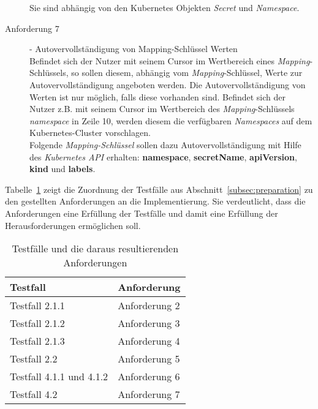 \begin{description}
        Sie sind abhängig von den Kubernetes Objekten \textit{Secret} und \textit{Namespace}.
  \item[Anforderung 7]{- Autovervollständigung von Mapping-Schlüssel Werten\\}
        Befindet sich der Nutzer mit seinem Cursor im Wertbereich eines \textit{Mapping}-Schlüssels, so sollen diesem, abhängig vom \textit{Mapping}-Schlüssel, Werte zur Autovervollständigung
        angeboten werden. Die Autovervollständigung von Werten ist nur möglich, falls diese vorhanden sind.
        Befindet sich der Nutzer z.B. mit seinem Cursor im Wertbereich des \textit{Mapping}-Schlüssels \textit{namespace} in Zeile 10,
        werden diesem die verfügbaren \textit{Namespaces} auf dem Kubernetes-Cluster vorschlagen.
        \\
        Folgende \textit{Mapping-Schlüssel} sollen dazu Autovervollständigung mit Hilfe des \textit{Kubernetes API} erhalten:
        \textbf{namespace}, \textbf{secretName}, \textbf{apiVersion}, \textbf{kind} und \textbf{labels}.
\end{description}

Tabelle~\ref{tbl:test-cases-and-requirements} zeigt die Zuordnung der Testfälle aus Abschnitt~\ref{subsec:preparation} zu den gestellten Anforderungen an die Implementierung.
Sie verdeutlicht, dass die Anforderungen eine Erfüllung der Testfälle und damit eine Erfüllung der Herausforderungen ermöglichen soll.

\begin{table}[h]
  \centering
  \begin{tabular}{ll}
    \toprule
    \textbf{Testfall}        & \textbf{Anforderung} \\
    \midrule
    Testfall 2.1.1           & Anforderung 2        \\
    Testfall 2.1.2           & Anforderung 3        \\
    Testfall 2.1.3           & Anforderung 4        \\
    Testfall 2.2             & Anforderung 5        \\
    Testfall 4.1.1 und 4.1.2 & Anforderung 6        \\
    Testfall 4.2             & Anforderung 7        \\
    \bottomrule
  \end{tabular}
  \caption{Testfälle und die daraus resultierenden Anforderungen}
  \label{tbl:test-cases-and-requirements}
\end{table}



